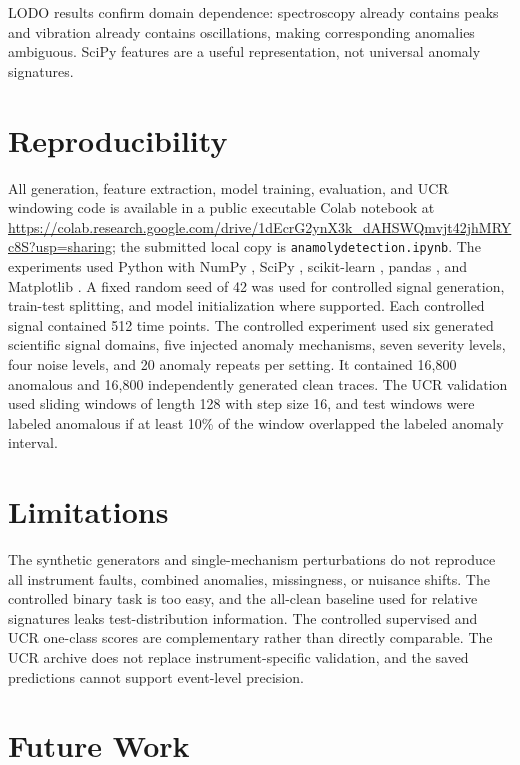 LODO results confirm domain dependence: spectroscopy already contains peaks and vibration already contains oscillations, making corresponding anomalies ambiguous. SciPy features are a useful representation, not universal anomaly signatures.


\section{Reproducibility}

All generation, feature extraction, model training, evaluation, and UCR windowing code is available in a public executable Colab notebook at \url{https://colab.research.google.com/drive/1dEcrG2ynX3k_dAHSWQmvjt42jhMRYc8S?usp=sharing}; the submitted local copy is \texttt{anamolydetection.ipynb}. The experiments used Python with NumPy \citep{numpy}, SciPy \citep{virtanen2020scipy}, scikit-learn \citep{pedregosa2011scikit}, pandas \citep{mckinney2010data}, and Matplotlib \citep{hunter2007matplotlib}. A fixed random seed of 42 was used for controlled signal generation, train-test splitting, and model initialization where supported. Each controlled signal contained 512 time points. The controlled experiment used six generated scientific signal domains, five injected anomaly mechanisms, seven severity levels, four noise levels, and 20 anomaly repeats per setting. It contained 16,800 anomalous and 16,800 independently generated clean traces. The UCR validation used sliding windows of length 128 with step size 16, and test windows were labeled anomalous if at least 10\% of the window overlapped the labeled anomaly interval.

\section{Limitations}

The synthetic generators and single-mechanism perturbations do not reproduce all instrument faults, combined anomalies, missingness, or nuisance shifts. The controlled binary task is too easy, and the all-clean baseline used for relative signatures leaks test-distribution information. The controlled supervised and UCR one-class scores are complementary rather than directly comparable. The UCR archive does not replace instrument-specific validation, and the saved predictions cannot support event-level precision.

\section{Future Work}

